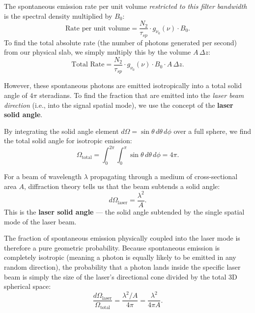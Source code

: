 The spontaneous emission rate per unit volume \emph{restricted to this filter bandwidth} is the spectral density multiplied by $B_0$:
\begin{equation*}
    \text{Rate per unit volume} = \frac{N_2}{\tau_{sp}} \cdot g_{\nu_0}(\nu) \cdot B_0.
\end{equation*}
To find the total absolute rate (the number of photons generated per second) from our physical slab, we simply multiply this by the volume $A\,\Delta z$:
\begin{equation*}
    \text{Total Rate} = \frac{N_2}{\tau_{sp}} \cdot g_{\nu_0}(\nu) \cdot B_0 \cdot A\,\Delta z.
\end{equation*}

However, these spontaneous photons are emitted isotropically into a total solid angle of $4\pi$ steradians. To find the fraction that are emitted into the \emph{laser beam direction} (i.e., into the signal spatial mode), we use the concept of the \textbf{laser solid angle}.

By integrating the solid angle element $d\Omega = \sin\theta\,d\theta\,d\phi$ over a full sphere, we find the total solid angle for isotropic emission:
\begin{equation*}
    \Omega_\text{total} = \int_0^{2\pi}\int_0^{\pi} \sin\theta\,d\theta\,d\phi = 4\pi.
\end{equation*}

For a beam of wavelength $\lambda$ propagating through a medium of cross-sectional area $A$, diffraction theory tells us that the beam subtends a solid angle:
\begin{equation*}
    d\Omega_\text{laser} = \frac{\lambda^2}{A}.
\end{equation*}
This is the \textbf{laser solid angle} — the solid angle subtended by the single spatial mode of the laser beam.

The fraction of spontaneous emission physically coupled into the laser mode is therefore a pure geometric probability. Because spontaneous emission is completely isotropic (meaning a photon is equally likely to be emitted in any random direction), the probability that a photon lands inside the specific laser beam is simply the size of the laser's directional cone divided by the total 3D spherical space:
\begin{equation*}
    \frac{d\Omega_\text{laser}}{\Omega_\text{total}} = \frac{\lambda^2/A}{4\pi}
    = \frac{\lambda^2}{4\pi A}.
\end{equation*}

